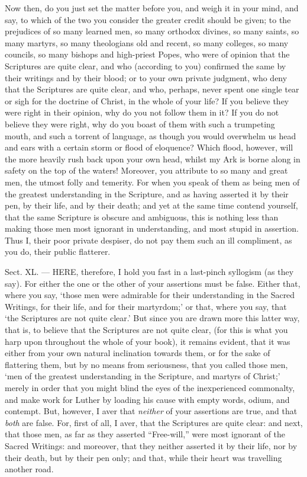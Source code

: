 Now then, do you just set the matter before you, and weigh it in your mind, and say, to which of the two you consider the greater credit should be given; to the prejudices of so many learned men, so many orthodox divines, so many saints, so many martyrs, so many theologians old and recent, so many colleges, so many councils, so many bishops and high-priest Popes, who were of opinion that the Scriptures are quite clear, and who (according to you) confirmed the same by their writings and by their blood; or to your own private judgment, who deny that the Scriptures are quite clear, and who, perhaps, never spent one single tear or sigh for the doctrine of Christ, in the whole of your life? If you believe they were right in their opinion, why do you not follow them in it? If you do not believe they were right, why do you boast of them with such a trumpeting mouth, and such a torrent of language, as though you would overwhelm us head and ears with a certain storm or flood of eloquence? Which flood, however, will the more heavily rush back upon your own head, whilst my Ark is borne along in safety on the top of the waters! Moreover, you attribute to so many and great men, the utmost folly and temerity. For when you speak of them as being men of the greatest understanding in the Scripture, and as having asserted it by their pen, by their life, and by their death; and yet at the same time contend yourself, that the same Scripture is obscure and ambiguous, this is nothing less than making those men most ignorant in understanding, and most stupid in assertion. Thus I, their poor private despiser, do not pay them such an ill compliment, as you do, their public flatterer.


Sect. XL. — HERE, therefore, I hold you fast in a last-pinch syllogism (as they say). For either the one or the other of your assertions must be false. Either that, where you say, ‘those men were admirable for their understanding in the Sacred Writings, for their life, and for their martyrdom;’ or that, where you say, that ‘the Scriptures are not quite clear.’ But since you are drawn more this latter way, that is, to believe that the Scriptures are not quite clear, (for this is what you harp upon throughout the whole of your book), it remains evident, that it was either from your own natural inclination towards them, or for the sake of flattering them, but by no means from seriousness, that you called those men, ‘men of the greatest understanding in the Scripture, and martyrs of Christ;’ merely in order that you might blind the eyes of the inexperienced commonalty, and make work for Luther by loading his cause with empty words, odium, and contempt. But, however, I aver that \emph{neither }of your assertions are true, and that \emph{both }are false. For, first of all, I aver, that the Scriptures are quite clear: and next, that those men, as far as they asserted “Free-will,” were most ignorant of the Sacred Writings: and moreover, that they neither asserted it by their life, nor by their death, but by their pen only; and that, while their heart was travelling another road.

